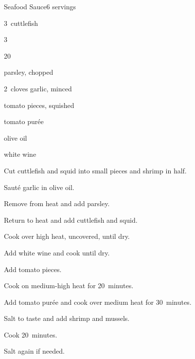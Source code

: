 \begin{recipe}{Seafood Sauce}{}{6 servings}

\begin{ingredients}
\item 3~cuttlefish
\item 3~
\item \lbs{\half} 
\item 20~
\item \C{\half} parsley, chopped
\item 2~cloves garlic, minced
\item {} tomato pieces, squished
\item {} tomato pur\'ee
\item \C{\half} olive oil
\item {} white wine
\end{ingredients}

\begin{directions}
\item Cut cuttlefish and squid into small pieces and shrimp in half.
\item Saut\'e garlic in olive oil.
\item Remove from heat and add parsley.
\item Return to heat and add cuttlefish and squid.
\item Cook over high heat, uncovered, until dry.
\item Add white wine and cook until dry.
\item Add tomato pieces.
\item Cook on medium-high heat for 20~minutes.
\item Add tomato pur\'ee and cook over medium heat for 30~minutes.
\item Salt to taste and add shrimp and mussels.
\item Cook 20~minutes.
\item Salt again if needed.
\end{directions}

\end{recipe}
